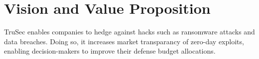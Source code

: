 \vspace{-0.16cm}
\section{Vision and Value Proposition}
\vspace{-0.15cm}
TruSec enables companies to hedge against hacks such as ransomware attacks and data breaches. Doing so, it increases market transparancy of zero-day exploits, enabling decision-makers to improve their defense budget allocations.
